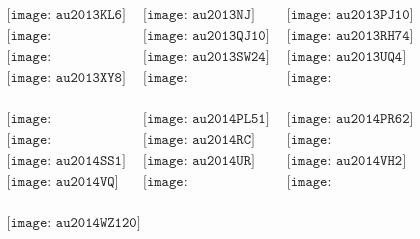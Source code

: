 \documentclass{article}
\begin{document}
        \clearpage
        \begin{figure}[H]
 \begin{center}$
 \begin{array}{cccc}
\texttt{[image: au2013KL6]}&\texttt{[image: au2013NJ]}&\texttt{[image: au2013PJ10]}\\\texttt{[image: au2013PS13]}&\texttt{[image: au2013QJ10]}&\texttt{[image: au2013RH74]}\\\texttt{[image: au2013SU24]}&\texttt{[image: au2013SW24]}&\texttt{[image: au2013UQ4]}\\\texttt{[image: au2013XY8]}&\texttt{[image: au2014HF177]}&\texttt{[image: au2014HR178]}\\
\end{array}$
\end{center}
\end{figure}

\begin{figure}[H]
 \begin{center}$
 \begin{array}{cccc}
\texttt{[image: au2014NE63]}&\texttt{[image: au2014PL51]}&\texttt{[image: au2014PR62]}\\\texttt{[image: au2014QO33]}&\texttt{[image: au2014RC]}&\texttt{[image: au2014SF304]}\\\texttt{[image: au2014SS1]}&\texttt{[image: au2014UR]}&\texttt{[image: au2014VH2]}\\\texttt{[image: au2014VQ]}&\texttt{[image: au2014WF201]}&\texttt{[image: au2014WQ201]}\\
\end{array}$
\end{center}
\end{figure}

\begin{figure}[H]
 \begin{center}$
 \begin{array}{cccc}
\texttt{[image: au2014WZ120]}&
\end{array}$
\end{center}
\end{figure}


        \clearpage
        
\end{document}
